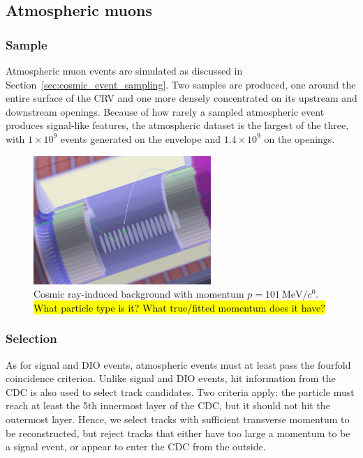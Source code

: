 \subsection{Atmospheric muons}

\subsubsection{Sample}

Atmospheric muon events are simulated as discussed in
Section~\ref{sec:cosmic_event_sampling}. Two samples are produced, one around the
entire surface of the CRV and one more densely concentrated on its upstream and
downstream openings. Because of how rarely a sampled atmospheric event produces
signal-like features, the atmospheric dataset is the largest of the three, with
$1 \times 10^9$ events generated on the envelope and $1.4 \times 10^9$ on the
openings.



\begin{figure}
    \centering
    \includegraphics[width=0.6\textwidth]{chapter6/atmospheric_event_in_cydet.png}
    \caption{Cosmic ray-induced background with momentum
    $p=\SI{101}{\MeV/\clight}$. \hl{What particle type is it? What true/fitted
    momentum does it have?}}
    \label{fig:cosmic_bg_in_cydet}
\end{figure}

\subsubsection{Selection}
As for signal and DIO events, atmospheric events must at least pass the fourfold
coincidence criterion. Unlike signal and DIO events, hit information from the
CDC is also used to select track candidates. Two criteria apply: the particle
must reach at least the 5th innermost layer of the CDC, but it should not hit
the outermost layer. Hence, we select tracks with sufficient transverse
momentum to be reconstructed, but reject tracks that either have too large a
momentum to be a signal event, or appear to enter the CDC from the outside. 


